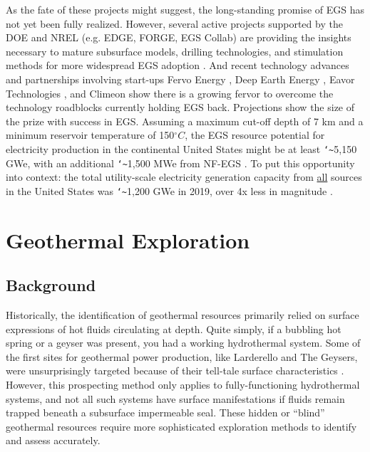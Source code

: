 As the fate of these projects might suggest, the long-standing promise of EGS has not yet been fully realized. However, several active projects supported by the DOE and NREL (e.g. EDGE, FORGE, EGS Collab) are providing the insights necessary to mature subsurface models, drilling technologies, and stimulation methods for more widespread EGS adoption \citep{hamm_geothermal_2021}. And recent technology advances and partnerships involving start-ups Fervo Energy \citep{moss_google_2021,shieber_geothermal_2021}, Deep Earth Energy \citep{geoenergy_saskatchewan_2021}, Eavor Technologies \citep{ross_energy_2020}, and Climeon \citep{climeon_climeon_2021,geoenergy_baseload_2020} show there is a growing fervor to overcome the technology roadblocks currently holding EGS back. Projections show the size of the prize with success in EGS. Assuming a maximum cut-off depth of 7 km and a minimum reservoir temperature of 150\(^\circ C\), the EGS resource potential for electricity production in the continental United States might be at least \texttt{\char`\~}5,150 GWe, with an additional \texttt{\char`\~}1,500 MWe from NF-EGS \citep{augustine_geovision_2019}. To put this opportunity into context: the total utility-scale electricity generation capacity from \underline{all} sources in the United States was \texttt{\char`\~}1,200 GWe in 2019, over 4x less in magnitude \citep{eia_electric_2020}.

\section{Geothermal Exploration}\label{ch2:geoexp}
\subsection{Background}
Historically, the identification of geothermal resources primarily relied on surface expressions of hot fluids circulating at depth. Quite simply, if a bubbling hot spring or a geyser was present, you had a working hydrothermal system. Some of the first sites for geothermal power production, like Larderello and The Geysers, were unsurprisingly targeted because of their tell-tale surface characteristics \citep[~p. 111]{glassley_geothermal_2015}. However, this prospecting method only applies to fully-functioning hydrothermal systems, and not all such systems have surface manifestations if fluids remain trapped beneath a subsurface impermeable seal. These hidden or “blind” geothermal resources require more sophisticated exploration methods to identify and assess accurately.

